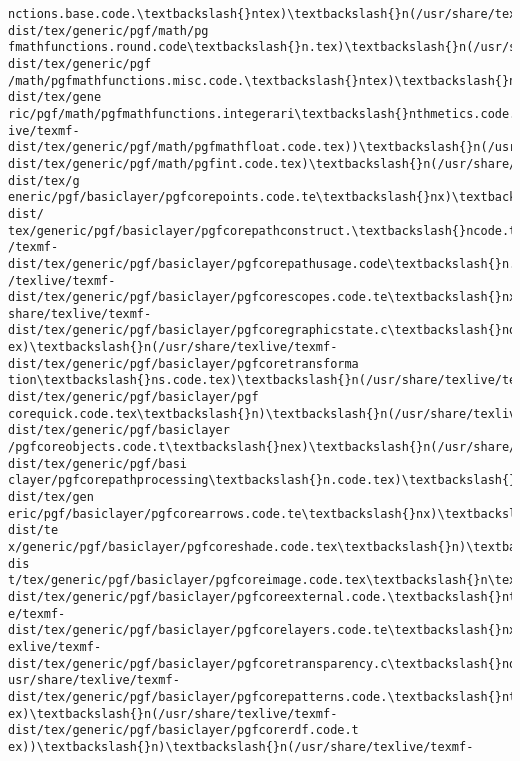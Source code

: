 \documentclass[11pt]{article}
\begin{document}
\begin{Verbatim}[commandchars=\\\{\}]
nctions.base.code.\textbackslash{}ntex)\textbackslash{}n(/usr/share/texlive/texmf-dist/tex/generic/pgf/math/pg
fmathfunctions.round.code\textbackslash{}n.tex)\textbackslash{}n(/usr/share/texlive/texmf-dist/tex/generic/pgf
/math/pgfmathfunctions.misc.code.\textbackslash{}ntex)\textbackslash{}n(/usr/share/texlive/texmf-dist/tex/gene
ric/pgf/math/pgfmathfunctions.integerari\textbackslash{}nthmetics.code.tex)))\textbackslash{}n(/usr/share/texl
ive/texmf-
dist/tex/generic/pgf/math/pgfmathfloat.code.tex))\textbackslash{}n(/usr/share/texlive/texmf-
dist/tex/generic/pgf/math/pgfint.code.tex)\textbackslash{}n(/usr/share/texlive/texmf-dist/tex/g
eneric/pgf/basiclayer/pgfcorepoints.code.te\textbackslash{}nx)\textbackslash{}n(/usr/share/texlive/texmf-dist/
tex/generic/pgf/basiclayer/pgfcorepathconstruct.\textbackslash{}ncode.tex)\textbackslash{}n(/usr/share/texlive
/texmf-dist/tex/generic/pgf/basiclayer/pgfcorepathusage.code\textbackslash{}n.tex)\textbackslash{}n(/usr/share
/texlive/texmf-dist/tex/generic/pgf/basiclayer/pgfcorescopes.code.te\textbackslash{}nx)\textbackslash{}n(/usr/
share/texlive/texmf-dist/tex/generic/pgf/basiclayer/pgfcoregraphicstate.c\textbackslash{}node.t
ex)\textbackslash{}n(/usr/share/texlive/texmf-dist/tex/generic/pgf/basiclayer/pgfcoretransforma
tion\textbackslash{}ns.code.tex)\textbackslash{}n(/usr/share/texlive/texmf-dist/tex/generic/pgf/basiclayer/pgf
corequick.code.tex\textbackslash{}n)\textbackslash{}n(/usr/share/texlive/texmf-dist/tex/generic/pgf/basiclayer
/pgfcoreobjects.code.t\textbackslash{}nex)\textbackslash{}n(/usr/share/texlive/texmf-dist/tex/generic/pgf/basi
clayer/pgfcorepathprocessing\textbackslash{}n.code.tex)\textbackslash{}n(/usr/share/texlive/texmf-dist/tex/gen
eric/pgf/basiclayer/pgfcorearrows.code.te\textbackslash{}nx)\textbackslash{}n(/usr/share/texlive/texmf-dist/te
x/generic/pgf/basiclayer/pgfcoreshade.code.tex\textbackslash{}n)\textbackslash{}n(/usr/share/texlive/texmf-dis
t/tex/generic/pgf/basiclayer/pgfcoreimage.code.tex\textbackslash{}n\textbackslash{}n(/usr/share/texlive/texmf-
dist/tex/generic/pgf/basiclayer/pgfcoreexternal.code.\textbackslash{}ntex))\textbackslash{}n(/usr/share/texliv
e/texmf-dist/tex/generic/pgf/basiclayer/pgfcorelayers.code.te\textbackslash{}nx)\textbackslash{}n(/usr/share/t
exlive/texmf-dist/tex/generic/pgf/basiclayer/pgfcoretransparency.c\textbackslash{}node.tex)\textbackslash{}n(/
usr/share/texlive/texmf-dist/tex/generic/pgf/basiclayer/pgfcorepatterns.code.\textbackslash{}nt
ex)\textbackslash{}n(/usr/share/texlive/texmf-dist/tex/generic/pgf/basiclayer/pgfcorerdf.code.t
ex))\textbackslash{}n)\textbackslash{}n(/usr/share/texlive/texmf-

\end{Verbatim}
\end{document}
